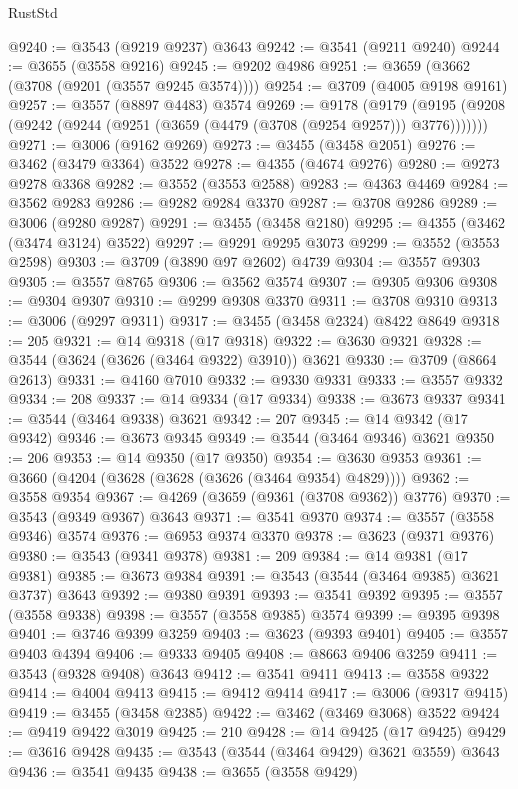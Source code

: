 \begin{lexlean}{RustStd}
\begin{coremodule}
@9240 := @3543 (@9219 @9237) @3643
@9242 := @3541 (@9211 @9240)
@9244 := @3655 (@3558 @9216)
@9245 := @9202 @4986
@9251 := @3659 (@3662 (@3708 (@9201 (@3557 @9245 @3574))))
@9254 := @3709 (@4005 @9198 @9161)
@9257 := @3557 (@8897 @4483) @3574
@9269 := @9178
    (@9179 (@9195 (@9208 (@9242 (@9244 (@9251 (@3659 (@4479 (@3708 (@9254 @9257))) @3776)))))))
@9271 := @3006 (@9162 @9269)
@9273 := @3455 (@3458 @2051)
@9276 := @3462 (@3479 @3364) @3522
@9278 := @4355 (@4674 @9276)
@9280 := @9273 @9278 @3368
@9282 := @3552 (@3553 @2588)
@9283 := @4363 @4469
@9284 := @3562 @9283
@9286 := @9282 @9284 @3370
@9287 := @3708 @9286
@9289 := @3006 (@9280 @9287)
@9291 := @3455 (@3458 @2180)
@9295 := @4355 (@3462 (@3474 @3124) @3522)
@9297 := @9291 @9295 @3073
@9299 := @3552 (@3553 @2598)
@9303 := @3709 (@3890 @97 @2602) @4739
@9304 := @3557 @9303
@9305 := @3557 @8765
@9306 := @3562 @3574
@9307 := @9305 @9306
@9308 := @9304 @9307
@9310 := @9299 @9308 @3370
@9311 := @3708 @9310
@9313 := @3006 (@9297 @9311)
@9317 := @3455 (@3458 @2324) @8422 @8649
@9318 := 205
@9321 := @14 @9318 (@17 @9318)
@9322 := @3630 @9321
@9328 := @3544 (@3624 (@3626 (@3464 @9322) @3910)) @3621
@9330 := @3709 (@8664 @2613)
@9331 := @4160 @7010
@9332 := @9330 @9331
@9333 := @3557 @9332
@9334 := 208
@9337 := @14 @9334 (@17 @9334)
@9338 := @3673 @9337
@9341 := @3544 (@3464 @9338) @3621
@9342 := 207
@9345 := @14 @9342 (@17 @9342)
@9346 := @3673 @9345
@9349 := @3544 (@3464 @9346) @3621
@9350 := 206
@9353 := @14 @9350 (@17 @9350)
@9354 := @3630 @9353
@9361 := @3660 (@4204 (@3628 (@3628 (@3626 (@3464 @9354) @4829))))
@9362 := @3558 @9354
@9367 := @4269 (@3659 (@9361 (@3708 @9362)) @3776)
@9370 := @3543 (@9349 @9367) @3643
@9371 := @3541 @9370
@9374 := @3557 (@3558 @9346) @3574
@9376 := @6953 @9374 @3370
@9378 := @3623 (@9371 @9376)
@9380 := @3543 (@9341 @9378)
@9381 := 209
@9384 := @14 @9381 (@17 @9381)
@9385 := @3673 @9384
@9391 := @3543 (@3544 (@3464 @9385) @3621 @3737) @3643
@9392 := @9380 @9391
@9393 := @3541 @9392
@9395 := @3557 (@3558 @9338)
@9398 := @3557 (@3558 @9385) @3574
@9399 := @9395 @9398
@9401 := @3746 @9399 @3259
@9403 := @3623 (@9393 @9401)
@9405 := @3557 @9403 @4394
@9406 := @9333 @9405
@9408 := @8663 @9406 @3259
@9411 := @3543 (@9328 @9408) @3643
@9412 := @3541 @9411
@9413 := @3558 @9322
@9414 := @4004 @9413
@9415 := @9412 @9414
@9417 := @3006 (@9317 @9415)
@9419 := @3455 (@3458 @2385)
@9422 := @3462 (@3469 @3068) @3522
@9424 := @9419 @9422 @3019
@9425 := 210
@9428 := @14 @9425 (@17 @9425)
@9429 := @3616 @9428
@9435 := @3543 (@3544 (@3464 @9429) @3621 @3559) @3643
@9436 := @3541 @9435
@9438 := @3655 (@3558 @9429)

\end{coremodule}
\end{lexlean}
